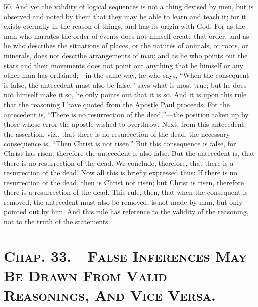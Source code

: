50. And yet the validity of logical sequences is not a thing devised
by men, but is observed and noted by them that they may be able to
learn and teach it; for it exists eternally in the reason of things,
and has its origin with God. For as the man who narrates the order of
events does not himself create that order; and as he who describes the
situations of places, or the natures of animals, or roots, or
minerals, does not describe arrangements of man; and as he who points
out the stars and their movements does not point out anything that he
himself or any other man has ordained;---in the same way, he who says,
``When the consequent is false, the antecedent must also be false,''
says what is most true; but he does not himself make it so, he only
points out that it is so. And it is upon this rule that the reasoning
I have quoted from the Apostle Paul proceeds. For the antecedent is,
``There is no resurrection of the dead,''---the position taken up by
those whose error the apostle wished to overthrow. Next, from this
antecedent, the assertion, viz., that there is no resurrection of the
dead, the necessary consequence is, ``Then Christ is not risen.'' But
this consequence is false, for Christ has risen; therefore the
antecedent is also false. But the antecedent is, that there is no
resurrection of the dead. We conclude, therefore, that there is a
resurrection of the dead. Now all this is briefly expressed thus: If
there is no resurrection of the dead, then is Christ not risen; but
Christ is risen, therefore there is a resurrection of the dead. This
rule, then, that when the consequent is removed, the antecedent must
also be removed, is not made by man, but only pointed out by him. And
this rule has reference to the validity of the reasoning, not to the
truth of the statements.

\section*{\textsc{Chap}. 33.\smaller---\textsc{False Inferences May Be
Drawn From Valid Reasonings, And Vice Versa}.}

